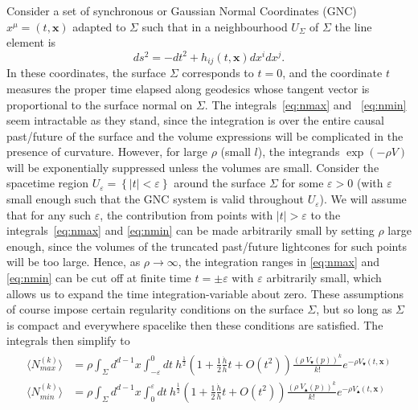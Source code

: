 \documentclass[12pt]{article}
\newcommand{\be}{\begin{equation}}
\newcommand{\ee}{\end{equation}}
\newcommand{\mb}[1]{\marginnote{\color{red}{\small MB:\,#1}}}
\begin{document}
Consider a set of synchronous or Gaussian Normal Coordinates (GNC) $x^\mu=(t,\mathbf x)$ adapted to $\Sigma$ such that in a neighbourhood $U_\Sigma$ of $\Sigma$ the line element is
\be
ds^2 = -dt^2 + h_{ij}(t,\mathbf x) dx^i dx^j.
\ee
In these coordinates, the surface $\Sigma$ corresponds to $t=0$, and the coordinate $t$ measures the proper time elapsed along geodesics whose tangent vector is proportional to the surface normal on $\Sigma$.
The integrals~\eqref{eq:nmax} and ~\eqref{eq:nmin} seem intractable as they stand, since the integration is over the entire causal past/future of the surface and the volume expressions will be complicated in the presence of curvature. However, for large $\rho$ (small $l$), the integrands $\exp(-\rho V)$ will be exponentially suppressed unless the volumes are small. Consider the spacetime region $U_\varepsilon=\left\{|t|<\varepsilon\right\}$ around the surface $\Sigma$ for some $\varepsilon>0$ (with $\varepsilon$ small enough such that the GNC system is valid throughout $U_\varepsilon$). We will assume that for any such $\varepsilon$, the contribution from points with $|t|>\varepsilon$ to the integrals~\eqref{eq:nmax} and \eqref{eq:nmin} can be made arbitrarily small by setting $\rho$ large enough, since the volumes of the truncated past/future lightcones for such points will be too large. Hence, as $\rho\rightarrow\infty$, the integration ranges in \eqref{eq:nmax} and \eqref{eq:nmin} can be cut off at finite time $t=\pm\varepsilon$ with $\varepsilon$ arbitrarily small, which allows us to expand the time integration-variable about zero. These assumptions of course impose certain regularity conditions on the surface $\Sigma$, but so long as $\Sigma$ is compact and everywhere spacelike  then these conditions are satisfied.\mb{do we need to say more about this? e.g. can't have asymp. null $\Sigma$ i guess} The integrals then simplify to
\begin{gather}\label{eq:nmax_and_eq:nmin}
\begin{aligned}
\langle N_{max}^{(k)}\rangle & =\rho \int_{\Sigma}d^{d-1}x\int_{-\varepsilon}^{0}dt\:
h^{\frac{1}{2}}\left(1+
\frac{1}{2}\frac{\dot{h}}{h}t+O(t^2)\right)
 \frac{\left(\rho\: V_\blacktriangledown(p)\right)^k}{k!} e^{-\rho V_\blacktriangledown(t,\mathbf x)}
\\
\langle N_{min}^{(k)}\rangle & =\rho \int_{\Sigma}d^{d-1}x\int_{0}^{\varepsilon}dt\:
h^{\frac{1}{2}}\left(1+
\frac{1}{2}\frac{\dot{h}}{h}t+O(t^2)\right) \frac{\left(\rho\: V_\blacktriangle(p)\right)^k}{k!} e^{-\rho V_\blacktriangle(t,\mathbf x)}
\end{aligned}
\end{gather}
\end{document}
